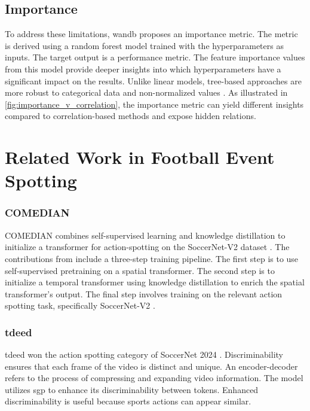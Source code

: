 \subsection{Importance}

To address these limitations, \acrfull{wandb} proposes an importance metric. The metric is derived using a random forest model trained with the hyperparameters as inputs. The target output is a performance metric. The feature importance values from this model provide deeper insights into which hyperparameters have a significant impact on the results. Unlike linear models, tree-based approaches are more robust to categorical data and non-normalized values \cite{wandb_parameter_importance}. As illustrated in \cref{fig:importance_v_correlation}, the importance metric can yield different insights compared to correlation-based methods and expose hidden relations.

\section{Related Work in Football Event Spotting}
\label{sec:fw_work}

\subsubsection{COMEDIAN}
COMEDIAN \cite{denize_comedian_2024} combines self-supervised learning and knowledge distillation to initialize a transformer for action-spotting on the SoccerNet-V2 dataset \cite{deliege_soccernet-v2_dataset_2021}. The contributions from \textcite{denize_comedian_2024} include a three-step training pipeline. The first step is to use self-supervised pretraining on a spatial transformer. The second step is to initialize a temporal transformer using knowledge distillation to enrich the spatial transformer's output. The final step involves training on the relevant action spotting task, specifically SoccerNet-V2 \cite{deliege_soccernet-v2_dataset_2021}.

\subsubsection{\acrfull{tdeed}}
\acrlong{tdeed} \cite{xarles_t-deed_2024} won the action spotting category of SoccerNet 2024 \cite{cioppa_soccernet_2024}. Discriminability ensures that each frame of the video is distinct and unique. An encoder-decoder refers to the process of compressing and expanding video information. The model utilizes \acrfull{sgp} to enhance its discriminability between tokens. Enhanced discriminability is useful because sports actions can appear similar. 

